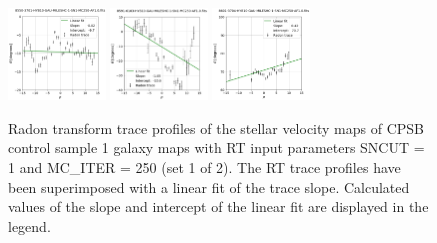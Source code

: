 \documentclass[fleqn,usenatbib]{mnras}
\begin{document}
\begin{figure}
    \includegraphics[width=0.23\textwidth]{Images/LINFITS/CC1-8550-3701-LINFIT-EBARS-MASKED.png}
    \includegraphics[width=0.23\textwidth]{Images/LINFITS/CC1-8591-6103-LINFIT-EBARS-MASKED.png}
    \includegraphics[width=0.23\textwidth]{Images/LINFITS/CC1-8601-3704-LINFIT-EBARS-MASKED.png}
    \caption{Radon transform trace profiles of the stellar velocity maps of CPSB control sample 1 galaxy maps with RT input parameters SNCUT = 1 and MC\_ITER = 250 (set 1 of 2). The RT trace profiles have been superimposed with a linear fit of the trace slope. Calculated values of the slope and intercept of the linear fit are displayed in the legend.}
    \label{fig:Radon-traces-CC1-LINFITS-1}
\end{figure}
\end{document}
